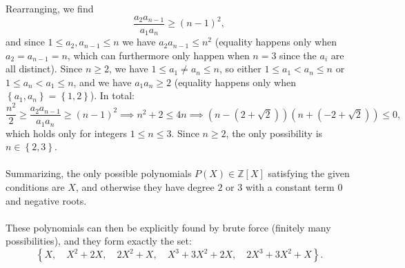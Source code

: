 \begin{solution}
\[    \]
    Rearranging, we find
    \[
        \frac{a_2 a_{n-1}}{a_1 a_n} \geq \left(n-1\right)^2,
    \]
    and since \( 1 \leq a_2, a_{n-1} \leq n \) we have \( a_2 a_{n-1} \leq n^2 \) (equality happens only when \( a_2 = a_{n-1} = n \), which can furthermore only happen when \( n = 3 \) since the \( a_i \) are all distinct). Since \( n \geq 2 \), we have \( 1 \leq a_1 \neq a_n \leq n \), so either \( 1 \leq a_1 < a_n\leq n \) or \( 1 \leq a_n < a_1\leq n \), and we have \( a_1 a_n \geq 2 \) (equality happens only when \( \left\{a_1, a_n\right\} = \left\{1, 2\right\} \)). In total:
    \[
        \frac{n^2}{2} \geq \frac{a_2 a_{n-1}}{a_1 a_n} \geq \left(n-1\right)^2 \implies n^2 + 2 \leq 4n \implies \left(n - \left(2 + \sqrt{2}\right)\right) \left(n + \left(-2 + \sqrt{2}\right)\right) \leq 0,
    \]
    which holds only for integers \( 1 \leq n \leq 3 \). Since \( n \geq 2 \), the only possibility is \( n \in \left\{2, 3\right\} \).
    \\\\
    Summarizing, the only possible polynomials \( P\left(X\right)\in\mathbb{Z}\left[X\right] \) satisfying the given conditions are \( X \), and otherwise they have degree \( 2 \) or \( 3 \) with a constant term \( 0 \) and negative roots.
    \\\\
    These polynomials can then be explicitly found by brute force (finitely many possibilities), and they form exactly the set:
    \[
        \left\{X,\quad X^2 + 2X, \quad 2X^2 + X,\quad X^3 + 3X^2 + 2X,\quad 2X^3 + 3X^2 + X\right\}.
    \]
\end{solution}
